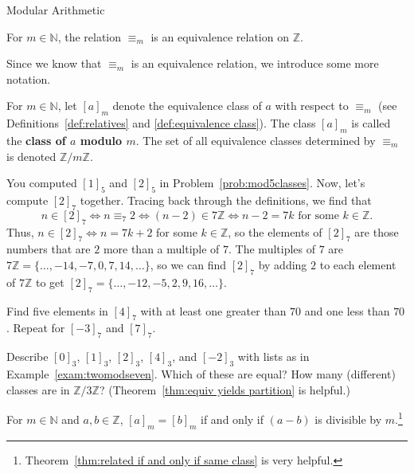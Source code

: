 \begin{section}{Modular Arithmetic}
\begin{theorem}
For  $m\in \mathbb{N}$, the relation $\equiv_m$ is an equivalence relation on $\mathbb{Z}$.
\end{theorem}

Since we know that $\equiv_m$ is an equivalence relation, we introduce some more notation.

\begin{definition}\label{def:modulo}
For  $m\in \mathbb{N}$, let $[a]_m$ denote the equivalence class of $a$ with respect to $\equiv_m$ (see Definitions~\ref{def:relatives} and \ref{def:equivalence class}). The class $[a]_m$ is called the \textbf{class of $a$ modulo $m$}. The set of all equivalence classes determined by  $\equiv_m$ is denoted $\mathbb{Z}/m\mathbb{Z}$.
\end{definition}

\begin{example}\label{exam:twomodseven}
You computed $[1]_5$ and $[2]_5$ in Problem~\ref{prob:mod5classes}. Now, let's compute $[2]_7$ together. 
Tracing back through the definitions, we find that \[n \in [2]_7 \iff n \equiv_7 2 \iff (n-2)\in 7\mathbb{Z} \iff n-2 = 7k \text{ for some $k\in \mathbb{Z}$}.\] Thus, $n \in [2]_7 \iff n = 7k +2$ for some $k\in \mathbb{Z}$, so the elements of $[2]_7$ are those numbers that are $2$ more than a multiple of $7$. The multiples of $7$ are $7\mathbb{Z} = \{\ldots,-14,-7,0,7,14,\ldots\}$, so we can find $[2]_7$ by adding $2$ to each element of $7\mathbb{Z}$ to get $[2]_7 = \{\ldots,-12,-5,2,9,16,\ldots\}$. 
\end{example}

\begin{problem}
Find five elements in $[4]_7$ with at least one greater than $70$ and one less than $70$. Repeat for $[-3]_7$ and $[7]_7$.
\end{problem}

\begin{problem}
Describe $[0]_3$, $[1]_3$, $[2]_3$, $[4]_3$, and $[-2]_3$ with lists as in Example~\ref{exam:twomodseven}. Which of these are equal?   How many (different) classes are in $\mathbb{Z}/3\mathbb{Z}$? (Theorem~\ref{thm:equiv yields partition} is helpful.)
\end{problem}

\begin{theorem}\label{thm.congclassesequal}
For  $m\in \mathbb{N}$ and $a,b\in \mathbb{Z}$, $[a]_m = [b]_m$ if and only if $(a-b)$ is divisible by $m$.\footnote{Theorem~\ref{thm:related if and only if same class} is very helpful.} 
\end{theorem}


\end{section}
